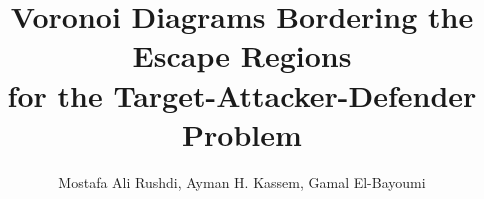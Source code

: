 \documentclass[final,5p,times,twocolumn]{elsarticle}
\begin{document}
\begin{frontmatter}



\title{Voronoi Diagrams Bordering the Escape Regions \\ for the Target-Attacker-Defender Problem}


\author{Mostafa Ali Rushdi, Ayman H. Kassem, Gamal El-Bayoumi} 
\address{Department of Aerospace Engineering\\
Cairo University\\
Cairo, Egypt\\
\tt morushdi@gmail.com, draymank@yahoo.com, gelbayoumi@yahoo.com}


\end{frontmatter}
\end{document}
